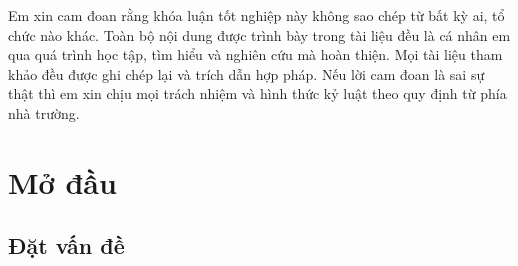 \documentclass[12pt,a4paper]{report}
\begin{document}
Em xin cam đoan rằng khóa luận tốt nghiệp này không sao chép từ bất kỳ ai, tổ chức nào khác. Toàn bộ nội dung được trình bày trong tài liệu đều là cá nhân em qua quá trình học tập, tìm hiểu và nghiên cứu mà hoàn thiện. Mọi tài liệu tham khảo đều được ghi chép lại và trích dẫn hợp pháp. Nếu lời cam đoan là sai sự thật thì em xin chịu mọi trách nhiệm và hình thức kỷ luật theo quy định từ phía nhà trường.

\tableofcontents{}
\clearpage{}

\listoffigures{}

\listoftables{}

\chapter{Mở đầu}

\section{Đặt vấn đề}



\nocite{*}
\printbibliography[heading=bibintoc, title=Tài liệu tham khảo]

\end{document}
